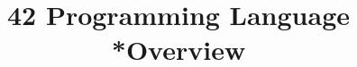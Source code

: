 \documentclass[secfooter,english]{beamer}
\title{42 Programming Language\\*Overview}
\author{}
\institute{}
\date{}
\begin{document}
\maketitle


\logo{}

\end{document}
